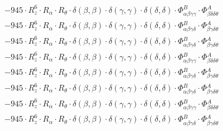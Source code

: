 \documentclass{article}
\begin{document}
\begin{subequations}
\begin{gather}
\begin{array}{c}
 \\[0.2em] 		 - 945 \cdot R_{z}^{6} \cdot R_{\alpha{}} \cdot R_{\theta{}} \cdot \delta{}\left(\beta{}, \beta{}\right) \cdot \delta{}\left(\gamma{}, \gamma{}\right) \cdot \delta{}\left(\delta{}, \delta{}\right) \cdot \Phi{}^{B}_{\alpha{}\beta{}\gamma{}\gamma{}} \cdot \Phi{}^{A}_{\beta{}\delta{}\delta{}\theta{}} 
 \\[0.2em] 		 - 945 \cdot R_{z}^{6} \cdot R_{\alpha{}} \cdot R_{\theta{}} \cdot \delta{}\left(\beta{}, \beta{}\right) \cdot \delta{}\left(\gamma{}, \gamma{}\right) \cdot \delta{}\left(\delta{}, \delta{}\right) \cdot \Phi{}^{B}_{\alpha{}\beta{}\gamma{}\delta{}} \cdot \Phi{}^{A}_{\beta{}\gamma{}\delta{}\theta{}} 
 \\[0.2em] 		 - 945 \cdot R_{z}^{6} \cdot R_{\alpha{}} \cdot R_{\theta{}} \cdot \delta{}\left(\beta{}, \beta{}\right) \cdot \delta{}\left(\gamma{}, \gamma{}\right) \cdot \delta{}\left(\delta{}, \delta{}\right) \cdot \Phi{}^{B}_{\alpha{}\beta{}\gamma{}\delta{}} \cdot \Phi{}^{A}_{\beta{}\gamma{}\delta{}\theta{}} 
 \\[0.2em] 		 - 945 \cdot R_{z}^{6} \cdot R_{\alpha{}} \cdot R_{\theta{}} \cdot \delta{}\left(\beta{}, \beta{}\right) \cdot \delta{}\left(\gamma{}, \gamma{}\right) \cdot \delta{}\left(\delta{}, \delta{}\right) \cdot \Phi{}^{B}_{\alpha{}\beta{}\gamma{}\gamma{}} \cdot \Phi{}^{A}_{\beta{}\delta{}\delta{}\theta{}} 
 \\[0.2em] 		 - 945 \cdot R_{z}^{6} \cdot R_{\alpha{}} \cdot R_{\theta{}} \cdot \delta{}\left(\beta{}, \beta{}\right) \cdot \delta{}\left(\gamma{}, \gamma{}\right) \cdot \delta{}\left(\delta{}, \delta{}\right) \cdot \Phi{}^{B}_{\alpha{}\beta{}\gamma{}\delta{}} \cdot \Phi{}^{A}_{\beta{}\gamma{}\delta{}\theta{}} 
 \\[0.2em] 		 - 945 \cdot R_{z}^{6} \cdot R_{\alpha{}} \cdot R_{\theta{}} \cdot \delta{}\left(\beta{}, \beta{}\right) \cdot \delta{}\left(\gamma{}, \gamma{}\right) \cdot \delta{}\left(\delta{}, \delta{}\right) \cdot \Phi{}^{B}_{\alpha{}\beta{}\gamma{}\delta{}} \cdot \Phi{}^{A}_{\beta{}\gamma{}\delta{}\theta{}} 
 \\[0.2em] 		 - 945 \cdot R_{z}^{6} \cdot R_{\alpha{}} \cdot R_{\theta{}} \cdot \delta{}\left(\beta{}, \beta{}\right) \cdot \delta{}\left(\gamma{}, \gamma{}\right) \cdot \delta{}\left(\delta{}, \delta{}\right) \cdot \Phi{}^{B}_{\alpha{}\beta{}\gamma{}\gamma{}} \cdot \Phi{}^{A}_{\beta{}\delta{}\delta{}\theta{}} 
 \\[0.2em] 		 - 945 \cdot R_{z}^{6} \cdot R_{\alpha{}} \cdot R_{\theta{}} \cdot \delta{}\left(\beta{}, \beta{}\right) \cdot \delta{}\left(\gamma{}, \gamma{}\right) \cdot \delta{}\left(\delta{}, \delta{}\right) \cdot \Phi{}^{B}_{\alpha{}\beta{}\gamma{}\delta{}} \cdot \Phi{}^{A}_{\beta{}\gamma{}\delta{}\theta{}} 

\end{array}
\end{gather}
\end{subequations}
\end{document}
